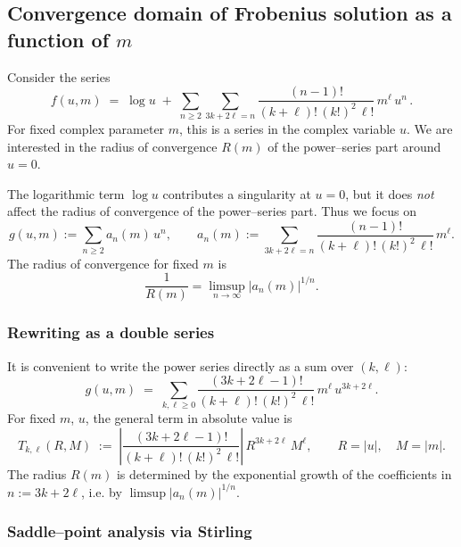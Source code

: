 \documentclass[11pt, a4paper]{article}
\numberwithin{equation}{section}
\begin{document}
\subsection{Convergence domain of Frobenius solution as a function of \texorpdfstring{$m$}{m}}

Consider the series
\begin{equation}
  f(u,m)
  \;=\;
  \log u \;+\; \sum_{n\ge 2} \sum_{3k+2\ell=n}
  \frac{(n-1)!}{(k+\ell)!\,(k!)^2\,\ell!}\,m^\ell\,u^n\,.
\end{equation}
For fixed complex parameter $m$, this is a series in the complex variable $u$.
We are interested in the radius of convergence $R(m)$ of the power--series part
around $u=0$.

The logarithmic term $\log u$ contributes a singularity at $u=0$, but it does
\emph{not} affect the radius of convergence of the power--series part. Thus we
focus on
\begin{equation}
  g(u,m) := \sum_{n\ge 2} a_n(m)\,u^n,
  \qquad
  a_n(m)
  := \sum_{3k+2\ell=n}
  \frac{(n-1)!}{(k+\ell)!\,(k!)^2\,\ell!}\,m^\ell.
\end{equation}
The radius of convergence for fixed $m$ is
\begin{equation}
  \frac{1}{R(m)}
  = \limsup_{n\to\infty} |a_n(m)|^{1/n}.
\end{equation}

\subsubsection{Rewriting as a double series}

It is convenient to write the power series directly as a sum over $(k,\ell)$:
\begin{equation}
  g(u,m) \;=\; \sum_{k,\ell\ge 0}
  \frac{(3k+2\ell-1)!}{(k+\ell)!\,(k!)^2\,\ell!}\,
  m^\ell\,u^{3k+2\ell}.
\end{equation}
For fixed $m$, $u$, the general term in absolute value is
\begin{equation}
  T_{k,\ell}(R,M) \;:=\;
  \left|
  \frac{(3k+2\ell-1)!}{(k+\ell)!\,(k!)^2\,\ell!}
  \right|\,
  R^{3k+2\ell}\,M^\ell,
  \qquad
  R = |u|,\quad M = |m|.
\end{equation}
The radius $R(m)$ is determined by the exponential growth of the coefficients in
$n := 3k+2\ell$, i.e. by $\limsup |a_n(m)|^{1/n}$.

\subsubsection{Saddle--point analysis via Stirling}
\end{document}
